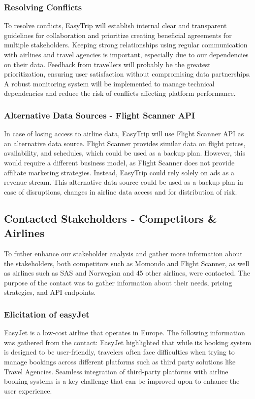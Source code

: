 \subsubsection{Resolving Conflicts}
To resolve conflicts, EasyTrip will establish internal clear and transparent guidelines for collaboration and prioritize creating beneficial agreements for multiple stakeholders. Keeping strong relationships using regular communication with airlines and travel agencies is important, especially due to our dependencies on their data. Feedback from travellers will probably be the greatest prioritization, ensuring user satisfaction without compromising data partnerships. A robust monitoring system will be implemented to manage technical dependencies and reduce the risk of conflicts affecting platform performance.

\subsubsection{Alternative Data Sources - Flight Scanner API}
In case of losing access to airline data, EasyTrip will use Flight Scanner API as an alternative data source. Flight Scanner provides similar data on flight prices, availability, and schedules, which could be used as a backup plan. However, this would require a different business model, as Flight Scanner does not provide affiliate marketing strategies. Instead, EasyTrip could rely solely on ads as a revenue stream. This alternative data source could be used as a backup plan in case of disruptions, changes in airline data access and for distribution of risk.

\subsection{Contacted Stakeholders - Competitors & Airlines}
To futher enhance our stakeholder analysis and gather more information about the stakeholders, both competitors such as Momondo and Flight Scanner, as well as airlines such as SAS and Norwegian and 45 other airlines, were contacted. The purpose of the contact was to gather information about their needs, pricing strategies, and API endpoints. 

\subsubsection{Elicitation of easyJet}
EasyJet is a low-cost airline that operates in Europe. The following information was gathered from the contact:
EasyJet highlighted that while its booking system is designed to be user-friendly, travelers often face difficulties when trying to manage bookings across different platforms such as third party solutions like Travel Agencies. Seamless integration of third-party platforms with airline booking systems is a key challenge that can be improved upon to enhance the user experience.

